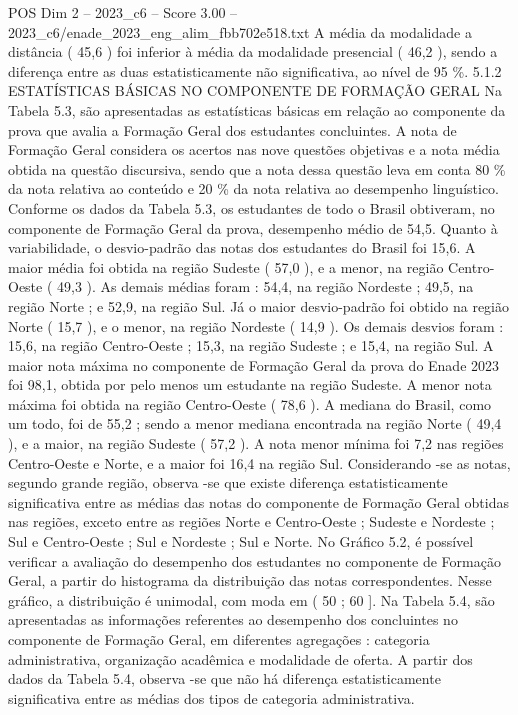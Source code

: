 \begin{textsample}{POS Dim 2 – 2023\_c6 – Score 3.00 – 2023\_c6/enade\_2023\_eng\_alim\_fbb702e518.txt}
A média da modalidade a distância ( 45,6 ) foi inferior à média da modalidade presencial ( 46,2 ), sendo a diferença entre as duas estatisticamente não significativa, ao nível de 95 \%. 5.1.2 ESTATÍSTICAS BÁSICAS NO COMPONENTE DE FORMAÇÃO GERAL Na Tabela 5.3, são apresentadas as estatísticas básicas em relação ao componente da prova que avalia a Formação Geral dos estudantes concluintes.
A nota de Formação Geral considera os acertos nas nove questões objetivas e a nota média obtida na questão discursiva, sendo que a nota dessa questão leva em conta 80 \% da nota relativa ao conteúdo e 20 \% da nota relativa ao desempenho linguístico.
Conforme os dados da Tabela 5.3, os estudantes de todo o Brasil obtiveram, no componente de Formação Geral da prova, desempenho médio de 54,5.
Quanto à variabilidade, o desvio-padrão das notas dos estudantes do Brasil foi 15,6.
A maior média foi obtida na região Sudeste ( 57,0 ), e a menor, na região Centro-Oeste ( 49,3 ).
As demais médias foram : 54,4, na região Nordeste ; 49,5, na região Norte ; e 52,9, na região Sul.
Já o maior desvio-padrão foi obtido na região Norte ( 15,7 ), e o menor, na região Nordeste ( 14,9 ).
Os demais desvios foram : 15,6, na região Centro-Oeste ; 15,3, na região Sudeste ; e 15,4, na região Sul.
A maior nota máxima no componente de Formação Geral da prova do Enade 2023 foi 98,1, obtida por pelo menos um estudante na região Sudeste.
A menor nota máxima foi obtida na região Centro-Oeste ( 78,6 ).
A mediana do Brasil, como um todo, foi de 55,2 ; sendo a menor mediana encontrada na região Norte ( 49,4 ), e a maior, na região Sudeste ( 57,2 ).
A nota menor mínima foi 7,2 nas regiões Centro-Oeste e Norte, e a maior foi 16,4 na região Sul.
Considerando -se as notas, segundo grande região, observa -se que existe diferença estatisticamente significativa entre as médias das notas do componente de Formação Geral obtidas nas regiões, exceto entre as regiões Norte e Centro-Oeste ; Sudeste e Nordeste ; Sul e Centro-Oeste ; Sul e Nordeste ; Sul e Norte.
No Gráfico 5.2, é possível verificar a avaliação do desempenho dos estudantes no componente de Formação Geral, a partir do histograma da distribuição das notas correspondentes.
Nesse gráfico, a distribuição é unimodal, com moda em ( 50 ; 60 ].
Na Tabela 5.4, são apresentadas as informações referentes ao desempenho dos concluintes no componente de Formação Geral, em diferentes agregações : categoria administrativa, organização acadêmica e modalidade de oferta.
A partir dos dados da Tabela 5.4, observa -se que não há diferença estatisticamente significativa entre as médias dos tipos de categoria administrativa.

\end{textsample}
